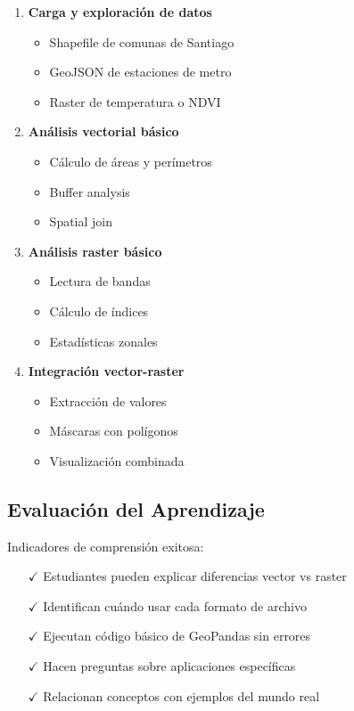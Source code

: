 \documentclass[11pt,a4paper]{article}
\begin{document}
\begin{enumerate}
    \item \textbf{Carga y exploración de datos}
    \begin{itemize}
        \item Shapefile de comunas de Santiago
        \item GeoJSON de estaciones de metro
        \item Raster de temperatura o NDVI
    \end{itemize}
    
    \item \textbf{Análisis vectorial básico}
    \begin{itemize}
        \item Cálculo de áreas y perímetros
        \item Buffer analysis
        \item Spatial join
    \end{itemize}
    
    \item \textbf{Análisis raster básico}
    \begin{itemize}
        \item Lectura de bandas
        \item Cálculo de índices
        \item Estadísticas zonales
    \end{itemize}
    
    \item \textbf{Integración vector-raster}
    \begin{itemize}
        \item Extracción de valores
        \item Máscaras con polígonos
        \item Visualización combinada
    \end{itemize}
\end{enumerate}

\subsection{Evaluación del Aprendizaje}

Indicadores de comprensión exitosa:

\begin{itemize}
    \item[$\checkmark$] Estudiantes pueden explicar diferencias vector vs raster
    \item[$\checkmark$] Identifican cuándo usar cada formato de archivo
    \item[$\checkmark$] Ejecutan código básico de GeoPandas sin errores
    \item[$\checkmark$] Hacen preguntas sobre aplicaciones específicas
    \item[$\checkmark$] Relacionan conceptos con ejemplos del mundo real
\end{itemize}
\end{document}

